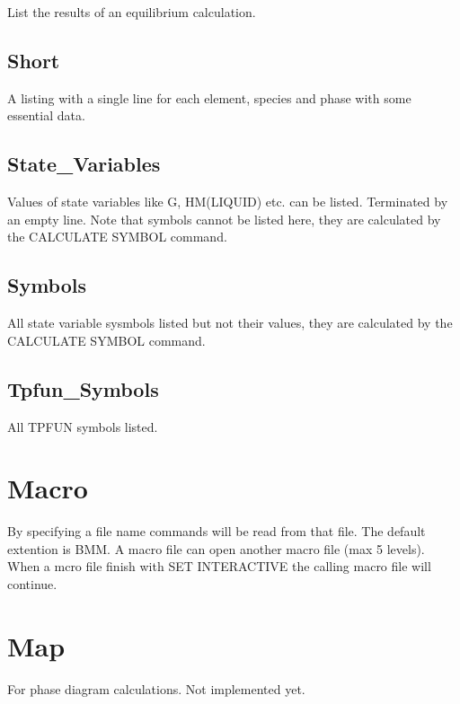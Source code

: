 \documentclass[12pt]{article}
\begin{document}
List the results of an equilibrium calculation.

\subsection{Short}

A listing with a single line for each element, species and phase with
some essential data.

\subsection{State\_Variables}

Values of state variables like G, HM(LIQUID) etc. can be listed.
Terminated by an empty line.  Note that symbols cannot be listed here,
they are calculated by the CALCULATE SYMBOL command.

\subsection{Symbols}

All state variable sysmbols listed but not their values, they are
calculated by the CALCULATE SYMBOL command.

\subsection{Tpfun\_Symbols}

All TPFUN symbols listed.

\section{Macro }

By specifying a file name commands will be read from that file.  The
default extention is BMM.  A macro file can open another macro file
(max 5 levels).  When a mcro file finish with SET INTERACTIVE the
calling macro file will continue.

\section{Map }

For phase diagram calculations.  Not implemented yet.
\end{document}
